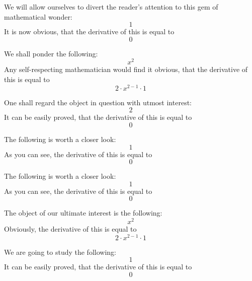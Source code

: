 \documentclass{article}
\begin{document}
We will allow ourselves to divert the reader's attention to this gem of mathematical wonder:
\begin{equation}
1 
\end{equation}
It is now obvious, that the derivative of this is equal to
\begin{equation}
0 
\end{equation}

We shall ponder the following:
\begin{equation}
x ^{2 } 
\end{equation}
Any self-respecting mathematician would find it obvious, that the derivative of this is equal to
\begin{equation}
2 \cdot x ^{2 - 1 } \cdot 1 
\end{equation}

One shall regard the object in question with utmost interest:
\begin{equation}
2 
\end{equation}
It can be easily proved, that the derivative of this is equal to
\begin{equation}
0 
\end{equation}

The following is worth a closer look:
\begin{equation}
1 
\end{equation}
As you can see, the derivative of this is equal to
\begin{equation}
0 
\end{equation}

The following is worth a closer look:
\begin{equation}
1 
\end{equation}
As you can see, the derivative of this is equal to
\begin{equation}
0 
\end{equation}

The object of our ultimate interest is the following:
\begin{equation}
x ^{2 } 
\end{equation}
Obviously, the derivative of this is equal to
\begin{equation}
2 \cdot x ^{2 - 1 } \cdot 1 
\end{equation}

We are going to study the following:
\begin{equation}
1 
\end{equation}
It can be easily proved, that the derivative of this is equal to
\begin{equation}
0 
\end{equation}
\end{document}
